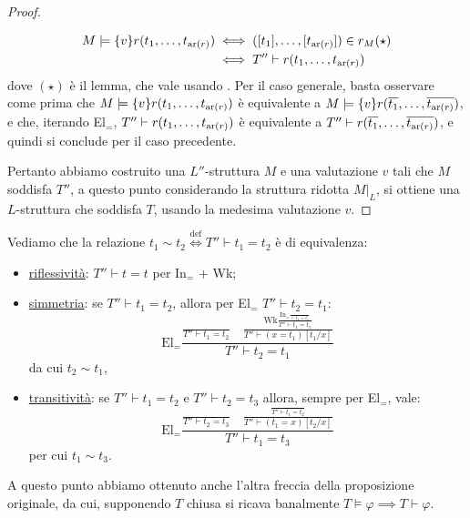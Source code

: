\begin{proof}
\begin{enumerate}
\begin{align*}
            M \models \{v\}r(t_1,\ldots,t_{\operatorname{ar}(r)}) &\iff ([t_1],\ldots,[t_{\operatorname{ar}(r)}]) \in r_M (\star)\\
                                                    &\iff T'' \vdash r(t_1,\ldots,t_{\operatorname{ar}(r)})
        \end{align*}
        dove $(\star)$ è il lemma, che vale usando . Per il caso generale, basta osservare come prima che $M \models \{v\}r(t_1,\ldots,t_{\operatorname{ar}(r)})$ è equivalente a $M \models \{v\}r(\overline{t_1},\ldots,\overline{t_{\operatorname{ar}(r)}})$,
        e che, iterando El$_=$, $T'' \vdash r(t_1,\ldots,t_{\operatorname{ar}(r)})$ è equivalente a $T'' \vdash r(\overline{t_1},\ldots,\overline{t_{\operatorname{ar}(r)}})$, e quindi si conclude per il caso precedente.
    \end{enumerate}
    Pertanto abbiamo costruito una $L''$-struttura $M$ e una valutazione $v$ tali che $M$ soddisfa $T''$, a questo punto considerando la struttura ridotta $M|_L$, si ottiene una $L$-struttura che soddisfa $T$, usando la medesima valutazione $v$. 
\end{proof}

\begin{remark}
    Vediamo che la relazione $t_1 \sim t_2 \overset{\text{def}}{\iff} T'' \vdash t_1 = t_2$ è di equivalenza:
    \begin{itemize}
        \item \underline{riflessività}: $T'' \vdash t = t$ per In$_=$ + Wk;
        \item \underline{simmetria}: se $T'' \vdash t_1 = t_2$, allora per El$_=$ $T'' \vdash t_2 = t_1$:
        \[ \text{El}_=\frac{\displaystyle\frac{}{T'' \vdash t_1 = t_2} \quad \frac{\displaystyle \text{Wk}\frac{\displaystyle \text{In}_=\frac{}{\vdash t_1 = t_1}}{T'' \vdash t_1 = t_1}}{T'' \vdash (x = t_1)[t_1/x]}}{T'' \vdash t_2 = t_1}\]
        da cui $t_2 \sim t_1$,
        \item \underline{transitività}: se $T'' \vdash t_1 = t_2$ e $T'' \vdash t_2 = t_3$ allora, sempre per El$_=$, vale:
        \[ \text{El}_=\frac{\displaystyle\frac{}{T'' \vdash t_2 = t_3} \quad \frac{\displaystyle\frac{}{T'' \vdash t_1 = t_2}}{T'' \vdash (t_1 = x)[t_2/x]}}{T'' \vdash t_1 = t_3} \]
        per cui $t_1 \sim t_3$.
    \end{itemize}
\end{remark}

A questo punto abbiamo ottenuto anche l'altra freccia della proposizione originale, da cui, supponendo $T$ chiusa si ricava banalmente $T \models \varphi \implies T \vdash \varphi$.

